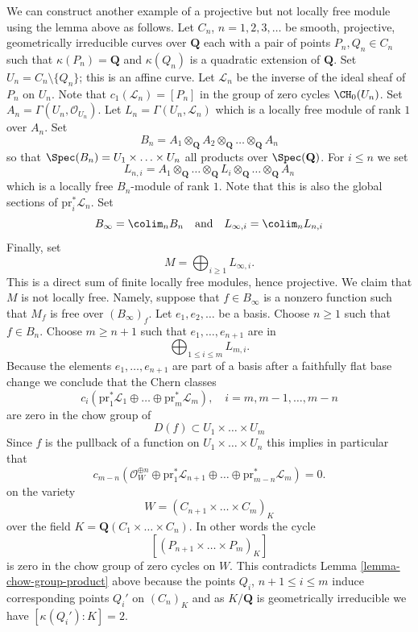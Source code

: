 \noindent
We can construct another example of a projective but not locally free
module using the lemma above as follows. Let
$C_n$, $n = 1, 2, 3, \ldots$ be smooth, projective, geometrically irreducible
curves over $\mathbf{Q}$ each with a pair of points
$P_n, Q_n \in C_n$ such that $\kappa(P_n) = \mathbf{Q}$ and
$\kappa(Q_n)$ is a quadratic extension of $\mathbf{Q}$.
Set $U_n = C_n \setminus \{Q_n\}$; this is an affine curve.
Let $\mathcal{L}_n$ be the inverse of the ideal sheaf of $P_n$
on $U_n$. Note that $c_1(\mathcal{L}_n) = [P_n]$ in the group of
zero cycles $\CH_0(U_n)$. Set $A_n = \Gamma(U_n, \mathcal{O}_{U_n})$.
Let $L_n = \Gamma(U_n, \mathcal{L}_n)$ which is a locally
free module of rank $1$ over $A_n$. Set
$$
B_n = A_1 \otimes_{\mathbf{Q}} A_2 \otimes_{\mathbf{Q}} \ldots
\otimes_{\mathbf{Q}} A_n
$$
so that $\Spec(B_n) = U_1 \times \ldots \times U_n$ all products
over $\Spec(\mathbf{Q})$. For $i \leq n$ we set
$$
L_{n, i} =
A_1 \otimes_{\mathbf{Q}} \ldots \otimes_{\mathbf{Q}} L_i
\otimes_{\mathbf{Q}} \ldots \otimes_{\mathbf{Q}} A_n
$$
which is a locally free $B_n$-module of rank $1$. Note that this is
also the global sections of $\text{pr}_i^*\mathcal{L}_n$. Set
$$
B_\infty = \colim_n B_n
\quad\text{and}\quad
L_{\infty, i} = \colim_n L_{n, i}
$$
Finally, set
$$
M = \bigoplus\nolimits_{i \geq 1} L_{\infty, i}.
$$
This is a direct sum of finite locally free modules, hence projective.
We claim that $M$ is not locally free. Namely, suppose that
$f \in B_\infty$ is a nonzero function such that $M_f$ is free
over $(B_\infty)_f$. Let $e_1, e_2, \ldots$ be a basis. Choose
$n \geq 1$ such that $f \in B_n$.
Choose $m \geq n + 1$ such that $e_1, \ldots, e_{n + 1}$ are in
$$
\bigoplus\nolimits_{1 \leq i \leq m} L_{m, i}.
$$
Because the elements $e_1, \ldots, e_{n + 1}$ are part of a basis
after a faithfully flat base change we conclude that
the Chern classes
$$
c_i(\text{pr}_1^*\mathcal{L}_1 \oplus \ldots \oplus
\text{pr}_m^*\mathcal{L}_m), \quad i = m, m - 1, \ldots, m - n
$$
are zero in the chow group of
$$
D(f) \subset U_1 \times \ldots \times U_m
$$
Since $f$ is the pullback of a function on $U_1 \times \ldots \times U_n$
this implies in particular that
$$
c_{m - n}(\mathcal{O}_W^{\oplus n} \oplus
\text{pr}_1^*\mathcal{L}_{n + 1} \oplus \ldots
\oplus \text{pr}_{m - n}^*\mathcal{L}_m) = 0.
$$
on the variety
$$
W = (C_{n + 1} \times \ldots \times C_m)_K
$$
over the field $K = \mathbf{Q}(C_1 \times \ldots \times C_n)$.
In other words the cycle
$$
[(P_{n + 1} \times \ldots \times P_m)_K]
$$
is zero in the chow group of zero cycles on $W$. This contradicts
Lemma \ref{lemma-chow-group-product}
above because the points $Q_i$, $n + 1 \leq i \leq m$
induce corresponding points $Q_i'$ on $(C_n)_K$ and as $K/\mathbf{Q}$
is geometrically irreducible we have $[\kappa(Q_i') : K] = 2$.

